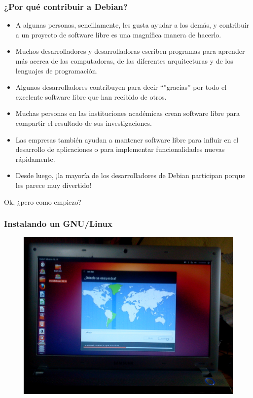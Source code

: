 \documentclass{beamer}
\begin{document}
\begin{frame}%
  \frametitle{¿Por qué contribuir a Debian?}
  \begin{itemize}
    \item A algunas personas, sencillamente, les gusta ayudar a los demás, y
      contribuir a un proyecto de software libre es una magnífica manera de
      hacerlo. \pause
    \item Muchos desarrolladores y desarrolladoras escriben programas para
      aprender más acerca de las computadoras, de las diferentes arquitecturas y
      de los lenguajes de programación. \pause
    \item Algunos desarrolladores contribuyen para decir ``''gracias'' por todo
      el excelente software libre que han recibido de otros. \pause
    \item Muchas personas en las instituciones académicas crean software libre
      para compartir el resultado de sus investigaciones. \pause
    \item Las empresas también ayudan a mantener software libre para influir en
      el desarrollo de aplicaciones o para implementar funcionalidades nuevas
      rápidamente. \pause
    \item Desde luego, ¡la mayoría de los desarrolladores de Debian participan
      porque les parece muy divertido!
  \end{itemize}
\end{frame}

\begin{frame}
 \centering
 \Huge Ok, ¿pero como empiezo?
\end{frame}
\begin{frame}
 \frametitle{Instalando un GNU/Linux}
    \begin{figure}
		\centering
		\includegraphics[width=0.7\linewidth]{images/ubuntu.jpg}
		\label{fig:Install Ubuntu}
	\end{figure}
\end{frame}
\end{document}
